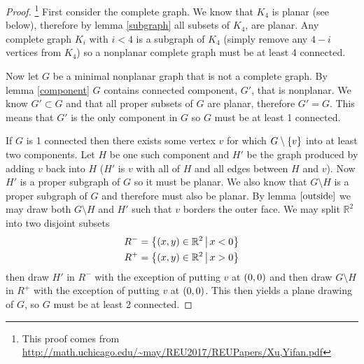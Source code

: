 \documentclass{article}
\begin{document}
\begin{proof}\footnote{This proof comes from \url{http://math.uchicago.edu/~may/REU2017/REUPapers/Xu,Yifan.pdf}}
	First consider the complete graph. We know that $K_4$ is planar (see below), therefore by lemma \ref{subgraph} all subsets of $K_4$, are planar. Any complete graph $K_i$ with $i < 4$ is a subgraph of $K_4$ (simply remove any $4-i$ vertices from $K_4$) so a nonplanar complete graph must be at least 4 connected.
	
	\begin{center}
	\end{center}
	
	
	Now let $G$ be a minimal nonplanar graph that is not a complete graph. By lemma \ref{component} $G$ contains connected component, $G'$, that is nonplanar. We know $G'\subset G$ and that all proper subsets of $G$ are planar, therefore $G'=G$. This means that $G'$ is the only component in $G$ so $G$ must be at least 1 connected.
	
	If $G$ is 1 connected then there exists some vertex $v$ for which $G\setminus\left\{ {v} \right\}$ into at least two components. Let $H$ be one such component and $H'$ be the graph produced by adding $v$ back into $H$ ($H'$ is $v$ with all of $H$ and all edges between $H$ and $v$). Now $H'$ is a proper subgraph of $G$ so it must be planar. We also know that $G\setminus H$ is a proper subgraph of $G$ and therefore must also be planar. By lemma $\ref{outside}$ we may draw both $G\setminus H$ and $H'$ such that $v$ borders the outer face. We may split $\mathbb R^2$ into two disjoint subsets
	\begin{align*}
	R^- &= \left\{{\left( {x} , {y} \right)\in\mathbb R^2} \,\middle|\, {x < 0}\right\}\\
	R^+&=\left\{{\left( {x} , {y} \right)\in\mathbb R^2} \,\middle|\, {x > 0}\right\}
	\end{align*}	
	then draw $H'$ in $R^-$ with the exception of putting $v$ at $\left( {0} , {0} \right)$ and then draw $G\setminus H$ in $R^+$ with the exception of putting $v$ at $\left( {0} , {0} \right)$. This then yields a plane drawing of $G$, so $G$ must be at least 2 connected.
\end{proof}
\end{document}
